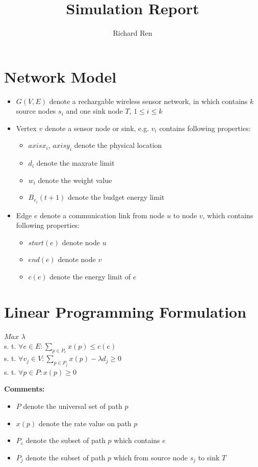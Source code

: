 \documentclass{article}
\begin{document}
\title{Simulation Report}
\author{Richard Ren}
\maketitle
\section{Network Model}
\begin{itemize}
\item $G(V,E)$ denote a rechargable wireless sensor network, in which contains $k$ source nodes $s_i$ and one sink node $T$, $1\leq i \leq k$ 
\item Vertex $v$ denote a sensor node or sink, e.g. $v_i$ contains following properties:
\begin{itemize}
\item $axisx_i$, $axisy_i$ denote the physical location
\item $d_i$ denote the maxrate limit
\item $w_i$ denote the weight value
\item $B_{v_i}(t+1)$ denote the budget energy limit  
\end{itemize}
\item Edge $e$ denote a communication link from node $u$ to node $v$, which contains following properties:
\begin{itemize}
\item $start(e)$ denote node $u$
\item $end(e)$ denote node $v$
\item $c(e)$ denote the energy limit of $e$
\end{itemize}
\end{itemize}

\section{Linear Programming Formulation}
\begin{center}
$Max$ $\lambda $\\
s. t. $\forall e\in E: \sum_{p\in P_e}{x(p)}\leq c(e) $\\
s. t. $\forall v_j\in V: \sum_{p\in P_j }{x(p)}-\lambda d_j\geq 0  $\\
s. t. $\forall p\in P: x(p)\geq 0$\\
\end{center}
\textbf{Comments:}\\
\begin{itemize}
\item $P$ denote the universal set of path $p$ \\
\item $x(p)$ denote the rate value on path $p$ \\
\item $P_e$ denote the subset of path $p$ which contains $e$\\
\item $P_j$ denote the subset of path $p$ which from source node $s_j$ to sink $T$\\
\end{itemize}



\end{document}
